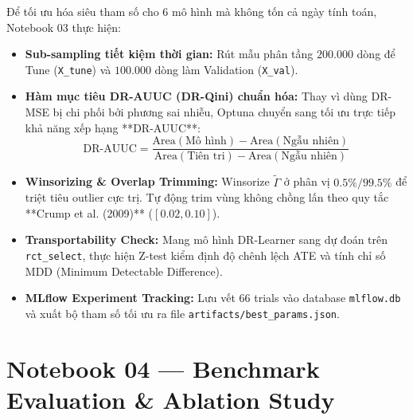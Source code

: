 Để tối ưu hóa siêu tham số cho 6 mô hình mà không tốn cả ngày tính toán, Notebook 03 thực hiện:
\begin{itemize}[leftmargin=*]
    \item \textbf{Sub-sampling tiết kiệm thời gian:} Rút mẫu phân tầng $200.000$ dòng để Tune (\texttt{X\_tune}) và $100.000$ dòng làm Validation (\texttt{X\_val}).
    \item \textbf{Hàm mục tiêu DR-AUUC (DR-Qini) chuẩn hóa:} Thay vì dùng DR-MSE bị chi phối bởi phương sai nhiễu, Optuna chuyển sang tối ưu trực tiếp khả năng xếp hạng **DR-AUUC**:
    \begin{equation}
        \text{DR-AUUC} = \frac{\text{Area}(\text{Mô hình}) - \text{Area}(\text{Ngẫu nhiên})}{\text{Area}(\text{Tiên tri}) - \text{Area}(\text{Ngẫu nhiên})}
    \end{equation}
    \item \textbf{Winsorizing \& Overlap Trimming:} Winsorize $\tilde{\Gamma}$ ở phân vị $0.5\% / 99.5\%$ để triệt tiêu outlier cực trị. Tự động trim vùng không chồng lấn theo quy tắc **Crump et al. (2009)** ($[0.02, 0.10]$).
    \item \textbf{Transportability Check:} Mang mô hình DR-Learner sang dự đoán trên \texttt{rct\_select}, thực hiện Z-test kiểm định độ chênh lệch ATE và tính chỉ số MDD (Minimum Detectable Difference).
    \item \textbf{MLflow Experiment Tracking:} Lưu vết $66$ trials vào database \texttt{mlflow.db} và xuất bộ tham số tối ưu ra file \texttt{artifacts/best_params.json}.
\end{itemize}

\section{Notebook 04 — Benchmark Evaluation \& Ablation Study}

